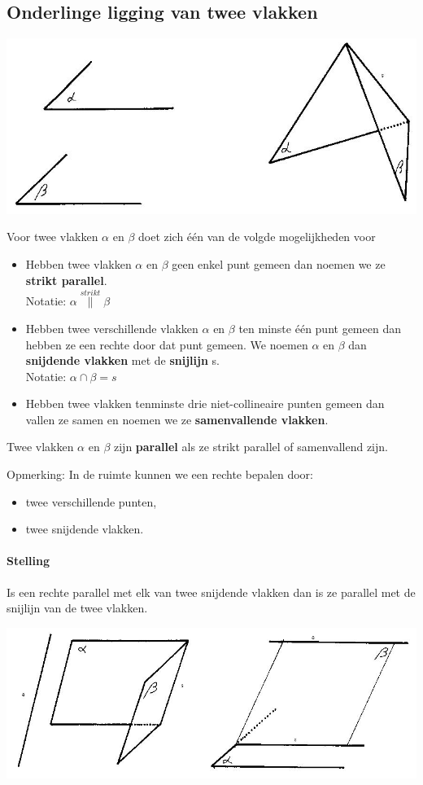 \documentclass[12pt,twoside]{article}
\begin{document}
\subsection{Onderlinge ligging van twee vlakken}

\begin{center}
  \includegraphics[width=.7\textwidth]{onderlinge_ligging_twee_vlakken}
\end{center}

Voor twee vlakken $\alpha$ en $\beta$ doet zich één van de volgde mogelijkheden voor
\begin{itemize}
  \item Hebben twee vlakken $\alpha$ en $\beta$ geen enkel punt gemeen dan noemen we ze {\bf strikt parallel}.\\
  Notatie: $\alpha \overset{strikt}{\parallel}\beta$
  \item Hebben twee verschillende vlakken $\alpha$ en $\beta$ ten minste één punt gemeen dan hebben ze een rechte door dat punt gemeen. We noemen $\alpha$ en $\beta$ dan {\bf snijdende vlakken} met de {\bf snijlijn} s.\\
  Notatie: $\alpha \cap \beta = s$
  \item Hebben twee vlakken tenminste drie niet-collineaire punten gemeen dan vallen ze samen en noemen we ze {\bf samenvallende vlakken}.
\end{itemize}

Twee vlakken $\alpha$ en $\beta$ zijn {\bf parallel} als ze strikt parallel of samenvallend zijn.

Opmerking: In de ruimte kunnen we een rechte bepalen door:
\begin{itemize}
  \item twee verschillende punten,
  \item twee snijdende vlakken.
\end{itemize}

\paragraph*{Stelling}
Is een rechte parallel met elk van twee snijdende vlakken dan is ze parallel met de snijlijn van de twee vlakken.
\begin{center}
  \includegraphics[width=.7\textwidth]{stelling_8}
\end{center}
\end{document}
